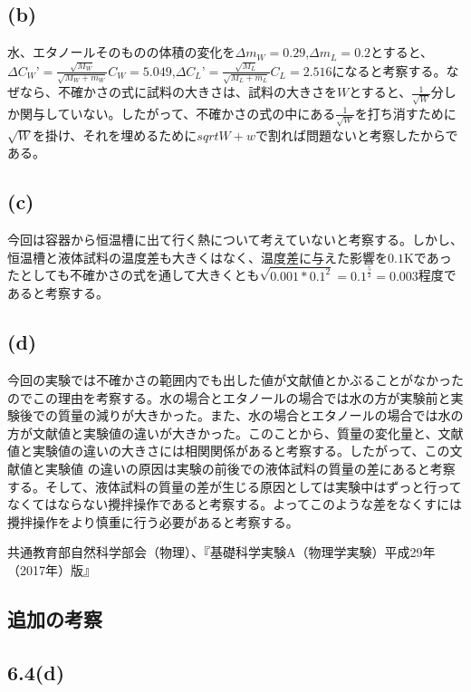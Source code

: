 \documentclass{jsarticle}
\begin{document}
\subsection{(b)}
水、エタノールそのものの体積の変化を$\Delta m_W = 0.29$,$\Delta m_L = 0.2$とすると、$\Delta C_W’ = \frac{\sqrt{M_W}}{\sqrt{M_W + m_W}}C_W = 5.049$,$\Delta C_L’ = \frac{\sqrt{M_L}}{\sqrt{M_L + m_L}}C_L = 2.516$になると考察する。なぜなら、不確かさの式に試料の大きさは、試料の大きさを$W$とすると、$\frac{1}{\sqrt{W}}$分しか関与していない。したがって、不確かさの式の中にある$\frac{1}{\sqrt{W}}$を打ち消すために$\sqrt{W}$を掛け、それを埋めるために$sqrt{W+w}$で割れば問題ないと考察したからである。
\subsection{(c)}
今回は容器から恒温槽に出て行く熱について考えていないと考察する。しかし、恒温槽と液体試料の温度差も大きくはなく、温度差に与えた影響を$0.1$Kであったとしても不確かさの式を通して大きくとも$\sqrt{0.001*0.1^2} = 0.1^{\frac{5}{2}} = 0.003$程度であると考察する。
\subsection{(d)}
今回の実験では不確かさの範囲内でも出した値が文献値とかぶることがなかったのでこの理由を考察する。水の場合とエタノールの場合では水の方が実験前と実験後での質量の減りが大きかった。また、水の場合とエタノールの場合では水の方が文献値と実験値の違いが大きかった。このことから、質量の変化量と、文献値と実験値の違いの大きさには相関関係があると考察する。したがって、この文献値と実験値
の違いの原因は実験の前後での液体試料の質量の差にあると考察する。そして、液体試料の質量の差が生じる原因としては実験中はずっと行ってなくてはならない攪拌操作であると考察する。よってこのような差をなくすには攪拌操作をより慎重に行う必要があると考察する。

\begin{thebibliography}{99}
 共通教育部自然科学部会（物理）、『基礎科学実験A（物理学実験）平成29年（2017年）版』
\end{thebibliography}

\newpage

\subsection{追加の考察}
\subsection{6.4(d)}
\end{document}
